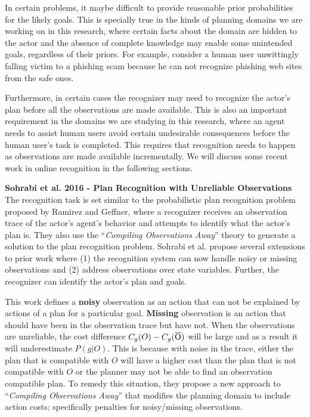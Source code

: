 In certain problems, it maybe difficult to provide reasonable prior probabilities for the likely goals. This is specially true in the kinds of planning domains we are working on in this research, where certain facts about the domain are hidden to the actor and the absence of complete knowledge may enable some unintended goals, regardless of their priors. For example, consider a human user unwittingly falling victim to a phishing scam because he can not recognize phishing web sites from the safe ones.

Furthermore, in certain cases the recognizer may need to recognize the actor's plan before all the observations are made available. This is also an important requirement in the domains we are studying in this research, where an agent needs to assist human users avoid certain undesirable consequences before the human user's task is completed. This requires that recognition needs to happen as observations are made available incrementally. We will discuss some recent work in online recognition in the following sections.

\noindent\textbf{Sohrabi et al. 2016 - Plan Recognition with Unreliable Observations}\\
The recognition task is set similar to the probabilistic plan recognition problem proposed by Ramirez and Geffner, where a recognizer receives an observation trace of the actor's agent's behavior and attempts to identify what the actor's plan is. They also use the ``\textit{Compiling Observations Away}'' theory to generate a solution to the plan recognition problem. Sohrabi et al. propose several extensions to prior work where (1) the recognition system can now handle noisy or missing observations and (2) address observations over state variables. Further, the recognizer can identify the actor's plan and goals.

This work defines a \textbf{noisy} observation as an action that can not be explained by actions of a plan for a particular goal. \textbf{Missing} observation is an action that should have been in the observation trace but have not. When the observations are unreliable, the cost difference $C_g(O) - C_g{(\overline{\rm O})}$ will be large and as a result it will underestimate $P(g|O)$. This is because with noise in the trace, either the plan that is compatible with $O$ will have a higher cost than the plan that is not compatible with $O$ or the planner may not be able to find an observation compatible plan. To remedy this situation, they propose a new approach to ``\textit{Compiling Observations Away}'' that modifies the planning domain to include action costs; specifically penalties for noisy/missing observations.

